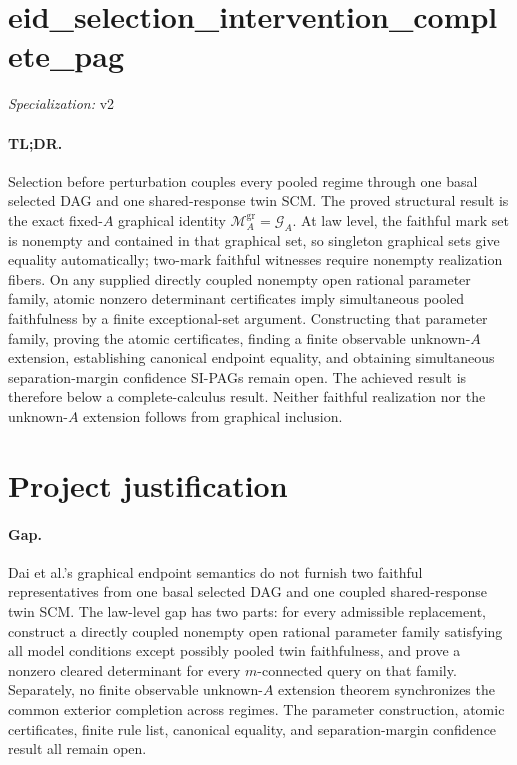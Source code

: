 \documentclass{article}
\begin{document}
\sloppy

\section*{eid\_\allowbreak{}selection\_\allowbreak{}intervention\_\allowbreak{}complete\_\allowbreak{}pag}

\noindent\textit{Specialization:} v2\par

\paragraph{TL;DR.} Selection before perturbation couples every pooled regime through one basal selected DAG and one shared-response twin SCM. The proved structural result is the exact fixed-\(A\) graphical identity \(\mathcal M_A^{\mathrm{gr}}=\mathcal G_A\). At law level, the faithful mark set is nonempty and contained in that graphical set, so singleton graphical sets give equality automatically; two-mark faithful witnesses require nonempty realization fibers. On any supplied directly coupled nonempty open rational parameter family, atomic nonzero determinant certificates imply simultaneous pooled faithfulness by a finite exceptional-set argument. Constructing that parameter family, proving the atomic certificates, finding a finite observable unknown-\(A\) extension, establishing canonical endpoint equality, and obtaining simultaneous separation-margin confidence SI-PAGs remain open. The achieved result is therefore below a complete-calculus result. Neither faithful realization nor the unknown-\(A\) extension follows from graphical inclusion.

\section{Project justification}

\paragraph{Gap.} Dai et al.'s graphical endpoint semantics do not furnish two faithful representatives from one basal selected DAG and one coupled shared-response twin SCM. The law-level gap has two parts: for every admissible replacement, construct a directly coupled nonempty open rational parameter family satisfying all model conditions except possibly pooled twin faithfulness, and prove a nonzero cleared determinant for every \(m\)-connected query on that family. Separately, no finite observable unknown-\(A\) extension theorem synchronizes the common exterior completion across regimes. The parameter construction, atomic certificates, finite rule list, canonical equality, and separation-margin confidence result all remain open.
\end{document}
